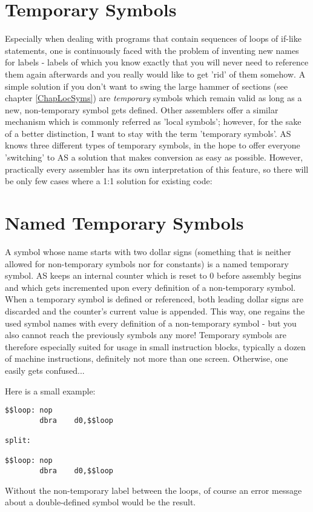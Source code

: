 \documentclass[12pt,twoside]{report}
\begin{document}

\section{Temporary Symbols}

Especially when dealing with programs that contain sequences of loops of
if-like statements, one is continuously faced with the problem of
inventing new names for labels - labels of which you know exactly that you
will never need to reference them again afterwards and you really would
like to get 'rid' of them somehow.  A simple solution if you don't want to
swing the large hammer of sections (see chapter \ref{ChapLocSyms}) are
{\em temporary} symbols which remain valid as long as a new,
non-temporary symbol gets defined.  Other assemblers offer a similar
mechanism which is commonly referred as 'local symbols'; however, for the
sake of a better distinction, I want to stay with the term 'temporary
symbols'.  AS knows three different types of temporary symbols, in the
hope to offer everyone 'switching' to AS a solution that makes conversion
as easy as possible.  However, practically every assembler has its own
interpretation of this feature, so there will be only few cases where a
1:1 solution for existing code:

\section{Named Temporary Symbols}

A symbol whose name starts with two dollar signs (something that is
neither allowed for non-temporary symbols nor for constants) is a named
temporary symbol.  AS keeps an internal counter which is reset to 0 before
assembly begins and which gets incremented upon every definition of a
non-temporary symbol.  When a temporary symbol is defined or referenced,
both leading dollar signs are discarded and the counter's current value is
appended.  This way, one regains the used symbol names with every
definition of a non-temporary symbol - but you also cannot reach the
previously symbols any more! Temporary symbols are therefore especially
suited for usage in small instruction blocks, typically a dozen of machine
instructions, definitely not more than one screen.  Otherwise, one easily
gets confused...

Here is a small example:
\begin{verbatim}
$$loop: nop
        dbra    d0,$$loop

split:

$$loop: nop
        dbra    d0,$$loop
\end{verbatim}
Without the non-temporary label between the loops, of course an error
message about a double-defined symbol would be the result.
\end{document}

